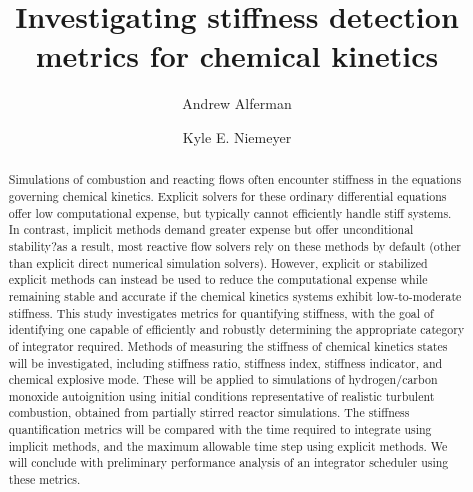 \documentclass[12pt]{ussci}
\title{ Investigating stiffness detection metrics for chemical kinetics }
\author[1]{Andrew Alferman}
\author[1,*]{Kyle E. Niemeyer}
\affil[1]{School of Mechanical, Industrial, and Manufacturing Engineering\\
		Oregon State University, Corvallis, OR 97331, USA}
\affil[*]{Corresponding author: \email{Kyle.Niemeyer@oregonstate.edu}}
\begin{document}
\maketitle

\begin{abstract} %


Simulations of combustion and reacting flows often encounter stiffness in the equations governing chemical kinetics.
Explicit solvers for these ordinary differential equations offer low computational expense, but typically cannot efficiently handle stiff systems.
In contrast, implicit methods demand greater expense but offer unconditional stability?as a result, most reactive flow solvers rely on these methods by default (other than explicit direct numerical simulation solvers).
However, explicit or stabilized explicit methods can instead be used to reduce the computational expense while remaining stable and accurate if the chemical kinetics systems exhibit low-to-moderate stiffness.
This study investigates metrics for quantifying stiffness, with the goal of identifying one capable of efficiently and robustly determining the appropriate category of integrator required.
Methods of measuring the stiffness of chemical kinetics states will be investigated, including stiffness ratio, stiffness index, stiffness indicator, and chemical explosive mode.
These will be applied to simulations of hydrogen/carbon monoxide autoignition using initial conditions representative of realistic turbulent combustion, obtained from partially stirred reactor simulations.
The stiffness quantification metrics will be compared with the time required to integrate using implicit methods, and the maximum allowable time step using explicit methods.
We will conclude with preliminary performance analysis of an integrator scheduler using these metrics.


\end{abstract}
\end{document}
